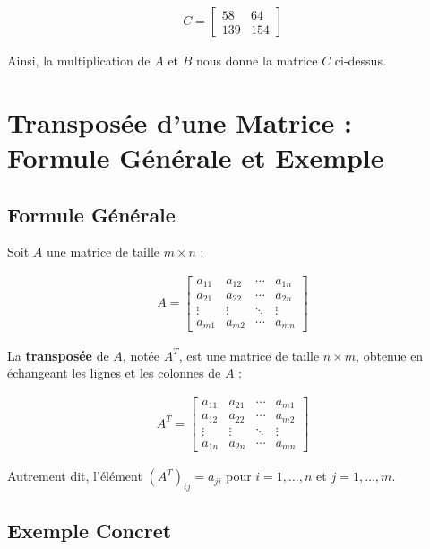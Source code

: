 \documentclass{report}
\begin{document}
\begin{multicols*}{2}
\begin{align*}
    C = \begin{bmatrix}
        58 & 64 \\
        139 & 154
    \end{bmatrix}
\end{align*}

\noindent
Ainsi, la multiplication de \( A \) et \( B \) nous donne la matrice \( C \) ci-dessus.

\section{Transposée d'une Matrice : Formule Générale et Exemple}

\subsection{Formule Générale}

Soit $A$ une matrice de taille $m \times n$ :

\begin{align*}
    A = \begin{bmatrix}
        a_{11} & a_{12} & \cdots & a_{1n} \\
        a_{21} & a_{22} & \cdots & a_{2n} \\
        \vdots & \vdots & \ddots & \vdots \\
        a_{m1} & a_{m2} & \cdots & a_{mn}
    \end{bmatrix}
\end{align*}

La \textbf{transposée} de $A$, notée $A^T$, est une matrice de taille $n \times m$,
obtenue en échangeant les lignes et les colonnes de $A$ :

\begin{align*}
    A^T = \begin{bmatrix}
        a_{11} & a_{21} & \cdots & a_{m1} \\
        a_{12} & a_{22} & \cdots & a_{m2} \\
        \vdots & \vdots & \ddots & \vdots \\
        a_{1n} & a_{2n} & \cdots & a_{mn}
    \end{bmatrix}
\end{align*}

Autrement dit, l'élément $(A^T)_{ij} = a_{ji}$ pour $i = 1, \dots, n$ et $j = 1, \dots, m$.

\subsection{Exemple Concret}


\end{multicols*}
\end{document}
